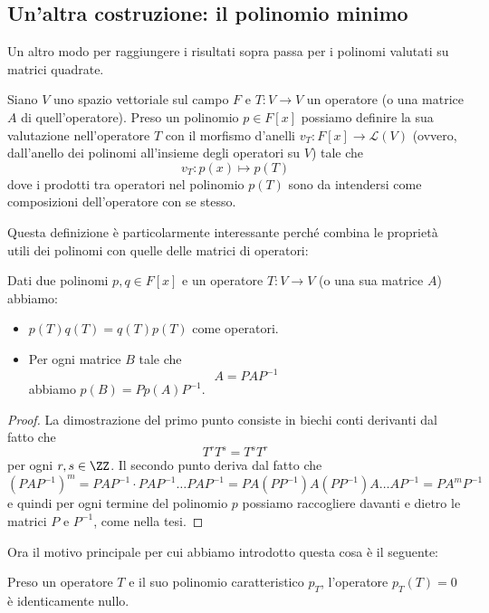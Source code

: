 \documentclass[11pt]{scrartcl}
\begin{document}
   	 \subsection{Un'altra costruzione: il polinomio minimo}
   	 Un altro modo per raggiungere i risultati sopra passa per i polinomi valutati su matrici quadrate.
   	 \begin{definition}
   	 	Siano $V$ uno spazio vettoriale sul campo $F$ e $T:V\to V$ un operatore (o una matrice $A$ di quell'operatore). Preso un polinomio $p\in F[x]$ possiamo definire la sua valutazione nell'operatore $T$ con il morfismo d'anelli $v_T:F[x]\to \mathcal{L}(V)$ (ovvero, dall'anello dei polinomi all'insieme degli operatori su $V$) tale che
   	 	$$v_T:p(x)\mapsto p(T)$$
   	 	dove i prodotti tra operatori nel polinomio $p(T)$ sono da intendersi come composizioni dell'operatore con se stesso. 
   	 \end{definition}
   	 Questa definizione è particolarmente interessante perché combina le proprietà utili dei polinomi con quelle delle matrici di operatori:
   	 \begin{proposition}
   	 	Dati due polinomi $p,q\in F[x]$ e un operatore $T:V\to V$ (o una sua matrice $A$) abbiamo:
   	 	\begin{itemize}
   	 		\item $p(T)q(T)=q(T)p(T)$ come operatori.
   	 		\item Per ogni matrice $B$ tale che 
   	 		$$A=PAP^{-1}$$
   	 		abbiamo $p(B)=Pp(A)P^{-1}$.
   	 	\end{itemize}
   	 \end{proposition}
   	 \begin{proof}
   	 	La dimostrazione del primo punto consiste in biechi conti derivanti dal fatto che 
   	 	$$T^rT^s=T^sT^r$$
   	 	per ogni $r,s\in \ZZ$. Il secondo punto deriva dal fatto che 
   	 	$$\left(PAP^{-1}\right)^m=PAP^{-1}\cdot PAP^{-1}\dots PAP^{-1}=PA(PP^{-1})A(PP^{-1})A\dots AP^{-1}=PA^mP^{-1}$$
   	 	e quindi per ogni termine del polinomio $p$ possiamo raccogliere davanti e dietro le matrici $P$ e $P^{-1}$, come nella tesi.
   	 \end{proof}
   	 Ora il motivo principale per cui abbiamo introdotto questa cosa è il seguente:
   	 \begin{theorem}
   	 	Preso un operatore $T$ e il suo polinomio caratteristico $p_T$, l'operatore $p_T(T)=0$ è identicamente nullo.
   	 \end{theorem}
\end{document}
